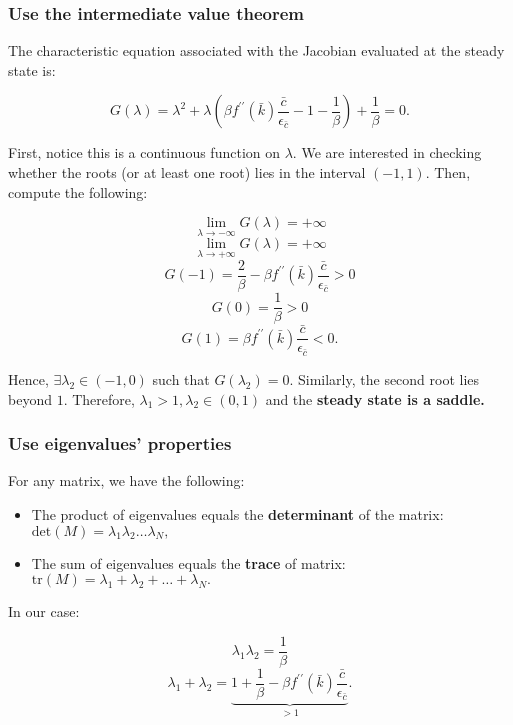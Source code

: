 \documentclass[11pt,a4paper,english]{article}
\providecommand{\tightlist}{%
  \setlength{\itemsep}{0pt}\setlength{\parskip}{0pt}}
\begin{document}
\hypertarget{use-the-intermediate-value-theorem}{%
\subsubsection{Use the intermediate value
theorem}\label{use-the-intermediate-value-theorem}}

The characteristic equation associated with the Jacobian evaluated at
the steady state is:

\[G(\lambda) = \lambda^{2} + \lambda \left( \beta f^{\prime \prime} (\bar{k}) \frac{\bar{c}}{\epsilon_{\bar{c}}} - 1 - \frac{1}{\beta} \right) + \frac{1}{\beta} = 0.\]

First, notice this is a continuous function on \(\lambda.\) We are
interested in checking whether the roots (or at least one root) lies in
the interval \((-1,1)\). Then, compute the following:

\[\lim_{\lambda \rightarrow -\infty} G(\lambda) = + \infty\]
\[\lim_{\lambda \rightarrow +\infty} G(\lambda) = + \infty\]
\[G(-1) = \frac{2}{\beta} - \beta f^{\prime \prime}(\bar{k})\frac{\bar{c}}{\epsilon_{\bar{c}}} > 0\]
\[G(0) = \frac{1}{\beta} > 0 \]
\[G(1) =  \beta f^{\prime \prime}(\bar{k})\frac{\bar{c}}{\epsilon_{\bar{c}}} < 0.\]

Hence, \(\exists \lambda_{2} \in (-1,0)\) such that
\(G(\lambda_{2}) = 0\). Similarly, the second root lies beyond \(1.\)
Therefore, \(\lambda_{1} > 1, \lambda_{2}\in(0,1)\) and the
\textbf{steady state is a saddle.}

\hypertarget{use-eigenvalues-properties}{%
\subsubsection{Use eigenvalues'
properties}\label{use-eigenvalues-properties}}

For any matrix, we have the following:

\begin{itemize}
\tightlist
\item
  The product of eigenvalues equals the \textbf{determinant} of the
  matrix:
  \(\mathrm{det}(M) = \lambda_{1} \lambda_{2} \ldots \lambda_{N},\)
\item
  The sum of eigenvalues equals the \textbf{trace} of matrix:
  \(\mathrm{tr}(M) = \lambda_{1} + \lambda_{2} + \ldots + \lambda_{N}.\)
\end{itemize}

In our case:

\[\lambda_{1} \lambda_{2} = \frac{1}{\beta} \]
\[\lambda_{1} + \lambda_{2} = \underbrace{1+ \frac{1}{\beta} - \beta f^{\prime \prime}(\bar{k})\frac{\bar{c}}{\epsilon_{\bar{c}}}}_{>1}.\]
\end{document}
